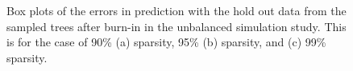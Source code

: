 \begin{figure}[H]
\begin{center}
\caption{ Box plots of the errors in prediction with the hold out data from the sampled trees after burn-in in the unbalanced simulation study. This is for the case of 90\% (a) sparsity, 95\% (b) sparsity, and (c) 99\% sparsity. }
\label{fig:unbalanced_study_results2}
\end{center}
\end{figure}

